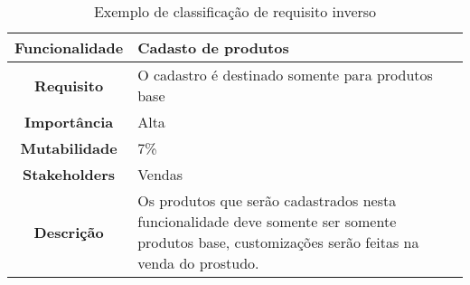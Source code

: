     \begin{table}[h!]
      \centering
      \begin{tabular}{|c|p{10cm}|}
        \hline
        \textbf{Funcionalidade} &
        Cadasto de produtos \\ \hline
        \textbf{Requisito} &
        O cadastro é destinado somente para produtos base \\ \hline
        \textbf{Importância} &
        Alta \\ \hline
        \textbf{Mutabilidade} &
        7\% \\ \hline
        \textbf{Stakeholders} &
        Vendas \\ \hline
        \textbf{Descrição} &
        Os produtos que serão cadastrados nesta funcionalidade deve somente ser
        somente produtos base, customizações serão feitas na venda do prostudo. \\ \hline
      \end{tabular}
      \caption{Exemplo de classificação de requisito inverso}
      \label{Tabela:7}
    \end{table}

